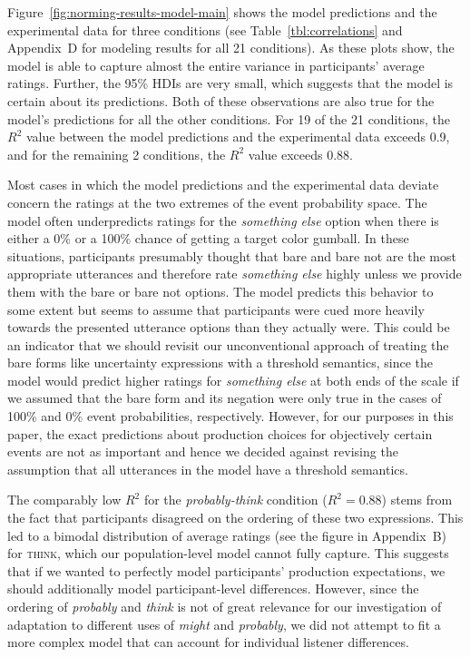 Figure~\ref{fig:norming-results-model-main} shows the model predictions and the experimental data for three conditions 
(see Table~\ref{tbl:correlations} and Appendix~D for modeling results for all 21 conditions). As these plots show, the model
is able to capture almost the entire variance in participants' average ratings. Further, the 95\% HDIs are very small, which suggests
that the model is certain about its predictions. Both of these observations are also true for the model's predictions for all the other
conditions. For 19 of the 21 conditions, the $R^2$ value between the model predictions and the experimental data exceeds 0.9,
and for the remaining 2 conditions, the $R^2$ value exceeds 0.88. 

Most cases in which the model predictions and the experimental data deviate concern the ratings at the two extremes of the event probability space.
The model often underpredicts ratings for the \textit{something else} option when there is either a 0\% or a 100\% chance of 
getting a target color gumball. In these situations, participants presumably thought that {\sc bare} and {\sc bare not} are the most appropriate
utterances and therefore rate \textit{something else} highly unless we provide them with the {\sc bare} or {\sc bare not} options. The model predicts
this behavior to some extent but seems to assume that participants were cued more heavily towards the presented utterance options than they actually were.
This could be an indicator that we should revisit our unconventional approach of treating the bare forms like uncertainty expressions with a threshold semantics,
since the model would predict higher ratings for \textit{something else} at both ends of the scale if we assumed that the bare form and its negation were only true
in the cases of 100\% and 0\% event probabilities, respectively. 
However, for our purposes in this paper, the exact predictions about production choices for objectively certain events are not as important and hence
we decided against revising the assumption that all utterances in the model have a threshold semantics.

The comparably low $R^2$ for the \textit{probably-think} condition ($R^2=0.88$) stems
from the fact that participants disagreed on the ordering of these two expressions. This  
led to a bimodal distribution of average ratings (see the figure in Appendix~B) for \textsc{think}, which our population-level 
model cannot fully capture. This suggests that if we wanted to perfectly model participants' production expectations, we should
additionally model participant-level differences. However, since the ordering of \textit{probably} and \textit{think} is not of great relevance
for our investigation of adaptation to different uses of \textit{might} and \textit{probably}, we did not attempt to fit a more complex model
that can account for individual listener differences. 

